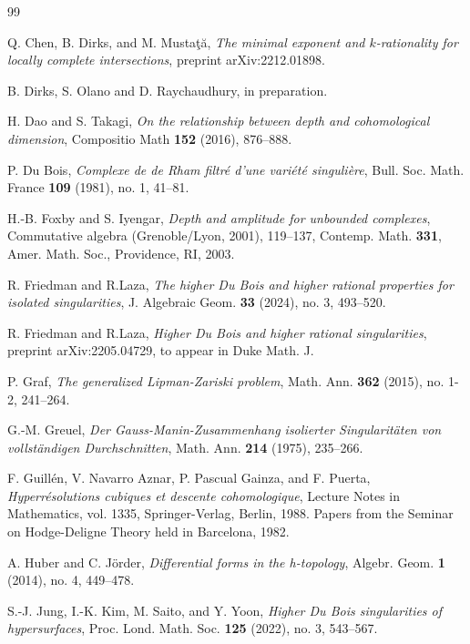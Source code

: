 \documentclass[11pt]{amsart}
\theoremstyle{definition}
\theoremstyle{plain}
\begin{document}
\begin{thebibliography}{99}



Q. Chen, B. Dirks, and M. Musta\c{t}\u{a}, \emph{The minimal exponent and $k$-rationality for locally complete
 intersections}, preprint arXiv:2212.01898.

B. Dirks, S. Olano and D. Raychaudhury, in preparation.

H. Dao and S. Takagi, \emph{On the relationship between depth and cohomological dimension}, Compositio Math \textbf{152} (2016), 876--888.

P. Du Bois,  \emph{Complexe de de Rham filtr\'e d'une vari\'et\'e singuli\`{e}re}, Bull. Soc. Math. France \textbf{109} (1981), no. 1, 41–81.


H.-B. Foxby and S. Iyengar, \emph{Depth and amplitude for unbounded complexes}, Commutative algebra (Grenoble/Lyon, 2001), 119--137, Contemp. Math.  \textbf{331}, Amer. Math. Soc., Providence, RI, 2003.

R. Friedman and R.Laza, \emph{ The higher Du Bois and higher rational properties for isolated singularities}, 
 J. Algebraic Geom. \textbf{33} (2024), no. 3, 493--520.
 
 R. Friedman and R.Laza, \emph{ Higher Du Bois and higher rational singularities}, 
 preprint arXiv:2205.04729, to appear in Duke Math. J.

P. Graf, \emph{The generalized {L}ipman-{Z}ariski problem}, Math. Ann. \textbf{362} (2015), no. 1-2, 241--264.

G.-M. Greuel, \emph{ Der {G}auss-{M}anin-{Z}usammenhang isolierter {S}ingularit\"{a}ten
  von vollst\"{a}ndigen {D}urchschnitten},  Math. Ann. \textbf{214} (1975), 235--266.

F. Guill\'en, V. Navarro Aznar, P. Pascual Gainza, and F. Puerta, \emph{Hyperr\'esolutions cubiques et descente cohomologique}, Lecture Notes in Mathematics, vol. 1335, Springer-Verlag, Berlin, 1988. Papers from the Seminar on Hodge-Deligne Theory held in Barcelona, 1982.


A. Huber and C. J\"{o}rder, \emph{ Differential forms in the h-topology},  Algebr. Geom. \textbf{1} (2014), no. 4, 449--478.

S.-J. Jung, I.-K. Kim, M. Saito, and Y. Yoon, \emph{Higher Du Bois singularities of hypersurfaces}, Proc. Lond. Math. Soc. \textbf{125} (2022), no. 3, 543--567.


\end{thebibliography}
\end{document}
